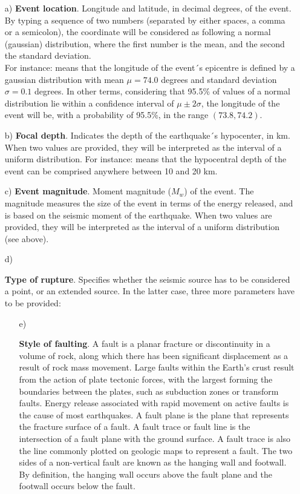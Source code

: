 \documentclass[12p]{article}
\begin{document}
\begin{itemize}
	\item[a)]{\textbf{Event location}. Longitude and latitude, in decimal
degrees, of the event. By typing a sequence of two numbers (separated by either
spaces, a comma or a semicolon), the coordinate will be considered as following
a normal (gaussian) distribution, where the first number is the mean, and the
second the standard deviation. \\ For instance:  means
that the longitude of the event´s epicentre is defined by a gaussian
distribution with mean $\mu=74.0$ degrees and standard deviation $\sigma=0.1$
degrees. In other terms, considering that 95.5\% of values of a normal distribution lie within a confidence interval 
of $\mu \pm 2\sigma$, the longitude of the event will be, with a probability of 95.5\%, in the range $(73.8,74.2)$.}
	\item[b)]{\textbf{Focal depth}. Indicates the depth of the earthquake´s
hypocenter, in km. When two values are provided, they will be interpreted as the
interval of a uniform distribution. For instance:  means that
the hypocentral depth of the event can be comprised anywhere between 10 and 20
km.}
	\item[c)]{\textbf{Event magnitude}. Moment magnitude ($M_w$) of the
event. The magnitude measures the size of the event in terms of the energy
released, and is based on the seismic moment of the earthquake. When two values
are provided, they will be interpreted as the interval of a uniform distribution
(see above).}
	\item[d)]{\textbf{Type of rupture}. Specifies whether the seismic source
has to be considered a point, or an extended source. In the latter case, three
more parameters have to be provided:
	\begin{itemize}
		\item[e)]{\textbf{Style of faulting}. A fault is a planar fracture
or discontinuity in a volume of rock, along which there has been significant
displacement as a result of rock mass movement. Large faults within the Earth's
crust result from the action of plate tectonic forces, with the largest forming
the boundaries between the plates, such as subduction zones or transform faults.
Energy release associated with rapid movement on active faults is the cause of
most earthquakes. 
A fault plane is the plane that represents the fracture surface of a fault. A
fault trace or fault line is the intersection of a fault plane with the ground
surface. A fault trace is also the line commonly plotted on geologic maps to
represent a fault. The two sides of a non-vertical fault are known as the
hanging wall and footwall. By definition, the hanging wall occurs above the
fault plane and the footwall occurs below the fault.

}
\end{itemize}}
\end{itemize}
\end{document}

